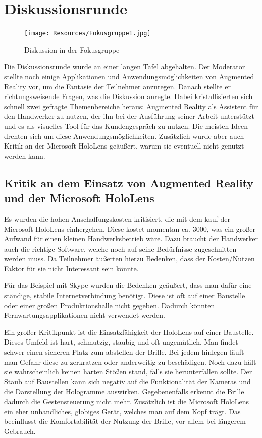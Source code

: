 \section{Diskussionsrunde}

\begin{figure}[h]
	\begin{center}
		\noindent\texttt{[image: Resources/Fokusgruppe1.jpg]}
		\caption{Diskussion in der Fokusgruppe}
	\end{center}
\end{figure}

Die Diskussionsrunde wurde an einer langen Tafel abgehalten. Der Moderator stellte noch einige Applikationen und Anwendungsmöglichkeiten von Augmented Reality vor, um die Fantasie der Teilnehmer anzuregen. Danach stellte er richtungsweisende Fragen, was die Diskussion anregte. Dabei kristallisierten sich schnell zwei gefragte Themenbereiche heraus: Augmented Reality als Assistent für den Handwerker zu nutzen, der ihn bei der Ausführung seiner Arbeit unterstützt und es als visuelles Tool für das Kundengespräch zu nutzen. Die meisten Ideen drehten sich um diese Anwendungsmöglichkeiten. Zusätzlich wurde aber auch Kritik an der Microsoft HoloLens geäußert, warum sie eventuell nicht genutzt werden kann.

\subsection{Kritik an dem Einsatz von Augmented Reality und der Microsoft HoloLens}

Es wurden die hohen Anschaffungskosten kritisiert, die mit dem kauf der Microsoft HoloLens einhergehen. Diese kostet momentan ca. 3000\EURdig, was ein großer Aufwand für einen kleinen Handwerksbetrieb wäre. Dazu braucht der Handwerker auch die richtige Software, welche noch auf seine Bedürfnisse zugeschnitten werden muss. Da Teilnehmer äußerten hierzu Bedenken, dass der Kosten/Nutzen Faktor für sie nicht Interessant sein könnte.

Für das Beispiel mit Skype wurden die Bedenken geäußert, dass man dafür eine ständige, stabile Internetverbindung benötigt. Diese ist oft auf einer Baustelle oder einer großen Produktionshalle nicht gegeben. Dadurch könnten Fernwartungsapplikationen nicht verwendet werden.

Ein großer Kritikpunkt ist die Einsatzfähigkeit der HoloLens auf einer Baustelle. Dieses Umfeld ist hart, schmutzig, staubig und oft ungemütlich. Man findet schwer einen sicheren Platz zum abstellen der Brille. Bei jedem hinlegen läuft man Gefahr diese zu zerkratzen oder anderweitig zu beschädigen. Noch dazu hält sie wahrscheinlich keinen harten Stößen stand, falls sie herunterfallen sollte. Der Staub auf Baustellen kann sich negativ auf die Funktionalität der Kameras und die Darstellung der Hologramme auswirken. Gegebenenfalls erkennt die Brille dadurch die Gestensteuerung nicht mehr. Zusätzlich ist die Microsoft HoloLens ein eher unhandliches, globiges Gerät, welches man auf dem Kopf trägt. Das beeinflusst die Komfortabilität der Nutzung der Brille, vor allem bei längerem Gebrauch.

